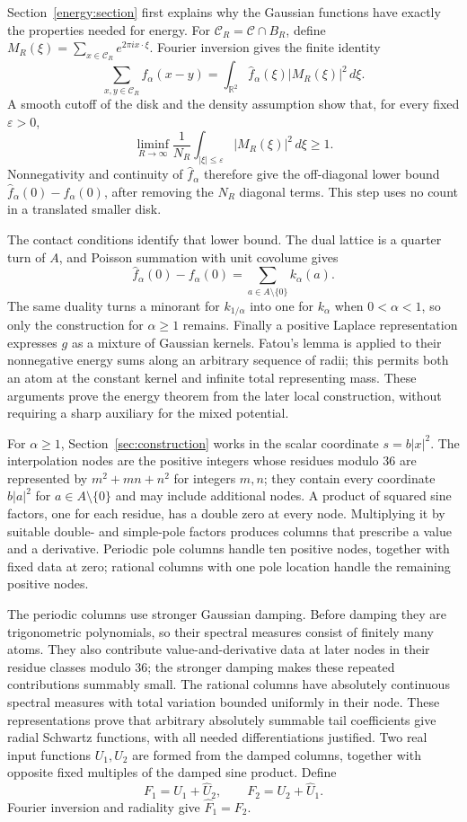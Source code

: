 \documentclass[11pt]{article}
\theoremstyle{remark}\newtheorem{remark}[theorem]{Remark}
\begin{document}
Section~\ref{energy:section} first explains why the Gaussian functions have
exactly the properties needed for energy. For
$\mathcal C_R=\mathcal C\cap B_R$, define
$M_R(\xi)=\sum_{x\in\mathcal C_R}e^{2\pi i x\cdot\xi}$.
Fourier inversion gives the finite identity
\[
 \sum_{x,y\in\mathcal C_R}f_\alpha(x-y)
 =\int_{\mathbb R^2}\widehat f_\alpha(\xi)|M_R(\xi)|^2\,d\xi.
\]
A smooth cutoff of the disk and the density assumption show that, for every
fixed $\varepsilon>0$,
\[
 \liminf_{R\to\infty}\frac1{N_R}
 \int_{|\xi|\le\varepsilon}|M_R(\xi)|^2\,d\xi\ge1.
\]
Nonnegativity and continuity of $\widehat f_\alpha$ therefore give the
off-diagonal lower bound $\widehat f_\alpha(0)-f_\alpha(0)$, after removing
the $N_R$ diagonal terms. This step uses no count in a translated smaller
disk.

The contact conditions identify that lower bound. The dual lattice is a
quarter turn of $A$, and Poisson summation with unit covolume gives
\[
 \widehat f_\alpha(0)-f_\alpha(0)
 =\sum_{a\in A\setminus\{0\}}k_\alpha(a).
\]
The same duality turns a minorant for $k_{1/\alpha}$ into one for
$k_\alpha$ when $0<\alpha<1$, so only the construction for
$\alpha\ge1$ remains. Finally a positive Laplace representation expresses
$g$ as a mixture of Gaussian kernels. Fatou's lemma is applied to their
nonnegative energy sums along an arbitrary sequence of radii; this permits
both an atom at the constant kernel and infinite total representing mass.
These arguments prove the energy theorem from the later local construction,
without requiring a sharp auxiliary for the mixed potential.

For $\alpha\ge1$, Section~\ref{sec:construction} works in the scalar
coordinate $s=b|x|^2$. The interpolation nodes are the positive integers
whose residues modulo $36$ are represented by $m^2+mn+n^2$ for integers
$m,n$; they contain every coordinate $b|a|^2$ for
$a\in A\setminus\{0\}$ and may include additional nodes. A product of squared
sine factors, one for each residue, has a double zero at every node.
Multiplying it by suitable double- and simple-pole factors
produces columns that prescribe a value and a derivative. Periodic pole
columns handle ten positive nodes, together with fixed data at zero;
rational columns with one pole location handle the remaining positive nodes.

The periodic columns use stronger Gaussian damping. Before damping they are
trigonometric polynomials, so their spectral measures consist of finitely
many atoms. They also contribute value-and-derivative data at later nodes
in their residue classes modulo $36$; the stronger damping makes these
repeated contributions summably small.
The rational columns have absolutely continuous spectral measures with
total variation bounded uniformly in their node. These representations
prove that arbitrary absolutely summable tail coefficients give radial
Schwartz functions, with all needed differentiations justified. Two real
input functions $U_1,U_2$ are formed from the damped columns, together with
opposite fixed multiples of the damped sine product. Define
\[
 F_1=U_1+\widehat U_2,\qquad F_2=U_2+\widehat U_1.
\]
Fourier inversion and radiality give $\widehat F_1=F_2$.
\end{document}
